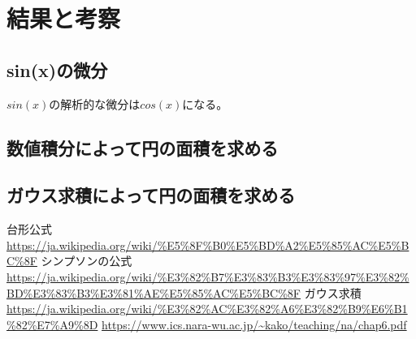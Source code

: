\documentclass[dvipdfmx]{jsarticle}
\begin{document}
\section{結果と考察}

\subsection{sin(x)の微分}
$sin(x)$の解析的な微分は$cos(x)$になる。



\subsection{数値積分によって円の面積を求める}


\subsection{ガウス求積によって円の面積を求める}


\begin{thebibliography}{10}
   台形公式
  \url{https://ja.wikipedia.org/wiki/%E5%8F%B0%E5%BD%A2%E5%85%AC%E5%BC%8F}
   シンプソンの公式
  \url{https://ja.wikipedia.org/wiki/%E3%82%B7%E3%83%B3%E3%83%97%E3%82%BD%E3%83%B3%E3%81%AE%E5%85%AC%E5%BC%8F}
   ガウス求積
  \url{https://ja.wikipedia.org/wiki/%E3%82%AC%E3%82%A6%E3%82%B9%E6%B1%82%E7%A9%8D}
  \url{https://www.ics.nara-wu.ac.jp/~kako/teaching/na/chap6.pdf}

\end{thebibliography}
\end{document}
